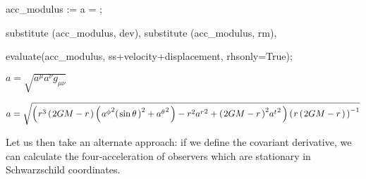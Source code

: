 \documentclass[10pt]{article}
\newcommand\brwrap[3]{%
  \setbox0=\hbox{$#2$}
  \left#1\vbox to \the\ht0{\hbox to 0pt{}}\right.\kern-.2em
  \begingroup #2\endgroup\kern-.15em
  \left.\vbox to \the\ht0{\hbox to 0pt{}}\right#3
}
\begin{document}
\begin{python}
acc_modulus := a = ;

substitute (acc_modulus, dev),
substitute (acc_modulus, rm),

evaluate(acc_modulus, ss+velocity+displacement, rhsonly=True);
\end{python}
\begin{adjustwidth}{1em}{0cm}${}a = \sqrt{a^{\mu} a^{\nu} g_{\mu \nu}}$\end{adjustwidth}
\begin{adjustwidth}{1em}{0cm}${}a = \sqrt{\brwrap{(}{{r}^{3} \brwrap{(}{2G M-r}{)} \brwrap{(}{{a^{\phi}}^{2} {\brwrap{(}{\sin{\theta}}{)}}^{2}+{a^{\theta}}^{2}}{)}-{r}^{2} {a^{r}}^{2}+{\brwrap{(}{2G M-r}{)}}^{2} {a^{t}}^{2}}{)} {\brwrap{(}{r \brwrap{(}{2G M-r}{)}}{)}}^{-1}}$\end{adjustwidth}
Let us then take an alternate approach: if we define the covariant derivative, 
we can calculate the four-acceleration of observers which are stationary in Schwarzschild coordinates.
\end{document}
